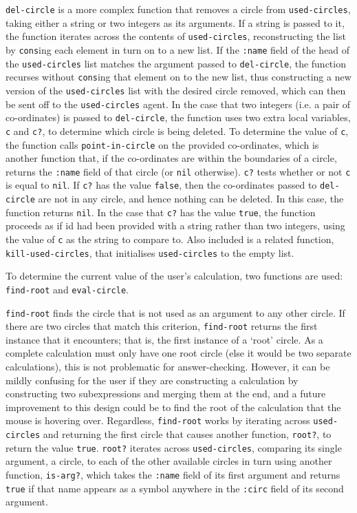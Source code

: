 \documentclass[12pt,twoside,notitlepage,xetex]{report}
\begin{document}
\verb¬del-circle¬ is a more complex function that removes a circle from
\verb¬used-circles¬, taking either a string or two integers as its arguments.
If a string is passed to it, the function iterates across the contents of
\verb¬used-circles¬, reconstructing the list by \verb¬cons¬ing each element in
turn on to a new list.  If the \verb¬:name¬ field of the head of the
\verb¬used-circles¬ list matches the argument passed to \verb¬del-circle¬, the
function recurses without \verb¬cons¬ing that element on to the new list, thus
constructing a new version of the \verb¬used-circles¬ list with the desired
circle removed, which can then be sent off to the \verb¬used-circles¬ agent.
In the case that two integers (i.e. a pair of co-ordinates) is passed to
\verb¬del-circle¬, the function uses two extra local variables, \verb¬c¬ and
\verb¬c?¬, to determine which circle is being deleted.  To determine the value
of \verb¬c¬, the function calls \verb¬point-in-circle¬ on the provided
co-ordinates, which is another function that, if the co-ordinates are within
the boundaries of a circle, returns the \verb¬:name¬ field of that circle (or
\verb¬nil¬ otherwise).  \verb¬c?¬ tests whether or not \verb¬c¬ is equal to
\verb¬nil¬.  If \verb¬c?¬ has the value \verb¬false¬, then the co-ordinates
passed to \verb¬del-circle¬ are not in any circle, and hence nothing can be
deleted.  In this case, the function returns \verb¬nil¬.  In the case that
\verb¬c?¬ has the value \verb¬true¬, the function proceeds as if id had been
provided with a string rather than two integers, using the value of \verb¬c¬ as
the string to compare to.  Also included is a related function,
\verb¬kill-used-circles¬, that initialises \verb¬used-circles¬ to the empty
list.

To determine the current value of the user's calculation, two functions are
used: \verb¬find-root¬ and \verb¬eval-circle¬.

\verb¬find-root¬ finds the circle that is not used as an argument to any other
circle.  If there are two circles that match this criterion, \verb¬find-root¬
returns the first instance that it encounters; that is, the first instance of
a `root' circle.  As a complete calculation must only have one root circle
(else it would be two separate calculations), this is not problematic for
answer-checking.  However, it can be mildly confusing for the user if they are
constructing a calculation by constructing two subexpressions and merging them
at the end, and a future improvement to this design could be to find the root
of the calculation that the mouse is hovering over.  Regardless,
\verb¬find-root¬ works by iterating across \verb¬used-circles¬ and returning
the first circle that causes another function, \verb¬root?¬, to return the
value \verb¬true¬.  \verb¬root?¬ iterates across \verb¬used-circles¬, comparing
its single argument, a circle, to each of the other available circles in turn
using another function, \verb¬is-arg?¬, which takes the \verb¬:name¬ field of
its first argument and returns \verb¬true¬ if that name appears as a symbol
anywhere in the \verb¬:circ¬ field of its second argument.
\end{document}
